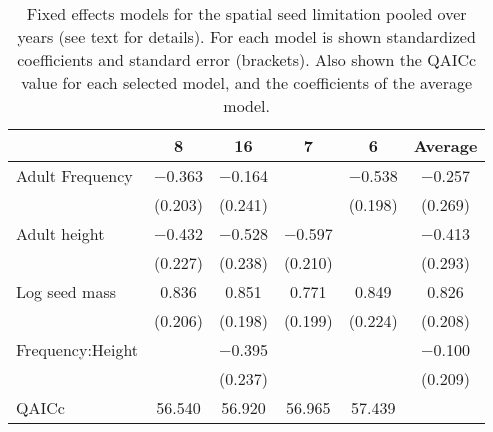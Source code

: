\begin{table}
\label{tab:SSL_glm}
\caption{Fixed effects models for the spatial seed limitation pooled over years (see text for details). For each model is shown standardized coefficients and standard error (brackets). Also shown  the QAICc value for each selected model, and the coefficients of the average model.}
\centering
\begin{tabular}[t]{lccccc}
\toprule
  & 8 & 16 & 7 & 6 & Average\\
\midrule
Adult Frequency & \num{-0.363} & \num{-0.164} &  & \num{-0.538} & \num{-0.257}\\
 & (\num{0.203}) & (\num{0.241}) &  & (\num{0.198}) & (\num{0.269})\\
Adult height & \num{-0.432} & \num{-0.528} & \num{-0.597} &  & \num{-0.413}\\
 & (\num{0.227}) & (\num{0.238}) & (\num{0.210}) &  & (\num{0.293})\\
Log seed mass & \num{0.836} & \num{0.851} & \num{0.771} & \num{0.849} & \num{0.826}\\
 & (\num{0.206}) & (\num{0.198}) & (\num{0.199}) & (\num{0.224}) & (\num{0.208})\\
Frequency:Height &  & \num{-0.395} &  &  & \num{-0.100}\\
 &  & (\num{0.237}) &  &  & (\num{0.209})\\
\midrule
QAICc & \num{56.540} & \num{56.920} & \num{56.965} & \num{57.439} & \\
\bottomrule
\end{tabular}
\end{table}
